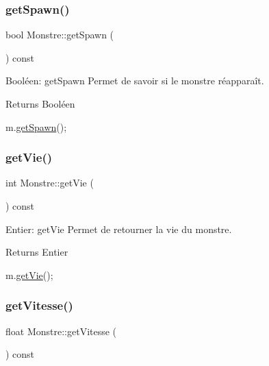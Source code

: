 \subsubsection{\texorpdfstring{get\+Spawn()}{getSpawn()}}
{\footnotesize\ttfamily bool Monstre\+::get\+Spawn (\begin{DoxyParamCaption}{ }\end{DoxyParamCaption}) const}



Booléen\+: get\+Spawn Permet de savoir si le monstre réapparaît. 

\begin{DoxyReturn}{Returns}
Booléen 
\begin{DoxyCode}
m.\hyperlink{classMonstre_a810f2e49356248d02f7b0e9b8ea16d85}{getSpawn}();
\end{DoxyCode}
 
\end{DoxyReturn}
\mbox{\label{classMonstre_a60b049ee5c4060f8aa512974414b2129}} 
\subsubsection{\texorpdfstring{get\+Vie()}{getVie()}}
{\footnotesize\ttfamily int Monstre\+::get\+Vie (\begin{DoxyParamCaption}{ }\end{DoxyParamCaption}) const}



Entier\+: get\+Vie Permet de retourner la vie du monstre. 

\begin{DoxyReturn}{Returns}
Entier 
\begin{DoxyCode}
m.\hyperlink{classMonstre_a60b049ee5c4060f8aa512974414b2129}{getVie}();
\end{DoxyCode}
 
\end{DoxyReturn}
\mbox{\label{classMonstre_a8f94de3aed809fd81f283afce7c3feba}} 
\subsubsection{\texorpdfstring{get\+Vitesse()}{getVitesse()}}
{\footnotesize\ttfamily float Monstre\+::get\+Vitesse (\begin{DoxyParamCaption}{ }\end{DoxyParamCaption}) const}



